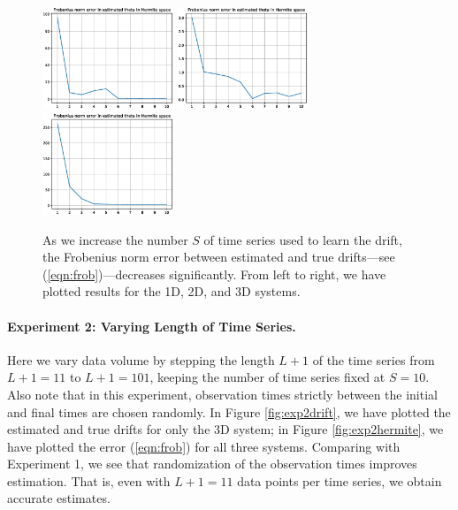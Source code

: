 \documentclass{article}
\begin{document}
\begin{figure}[th]
\begin{center}
\includegraphics[height=1.2in]{../1dcode/varying_num_timeseries/plots/hermite.eps}
\includegraphics[height=1.2in]{../2dcode/varying_num_timeseries/plots/hermite.eps}
\includegraphics[height=1.2in]{../3ddampedduffing/varying_num_timeseries/plots/hermite.eps}
\end{center}
\caption{As we increase the number $S$ of time series used to learn the drift, the Frobenius norm error between estimated and true drifts---see (\ref{eqn:frob})---decreases significantly.  From left to right, we have plotted results for the 1D, 2D, and 3D systems.}
\label{fig:exp1hermite}
\end{figure}

\vspace{-1.5ex}
\paragraph{Experiment 2: Varying Length of Time Series.} Here we vary data volume by stepping the length $L+1$ of the time series from $L+1 = 11$ to $L+1 = 101$, keeping the number of time series fixed at $S=10$.  Also note that in this experiment, observation times strictly between the initial and final times are chosen randomly.  In Figure \ref{fig:exp2drift}, we have plotted the estimated and true drifts for only the 3D system; in Figure \ref{fig:exp2hermite}, we have plotted the error (\ref{eqn:frob}) for all three systems.  Comparing with Experiment 1, we see that randomization of the observation times improves estimation.  That is, even with $L+1 = 11$ data points per time series, we obtain accurate estimates.
\end{document}
